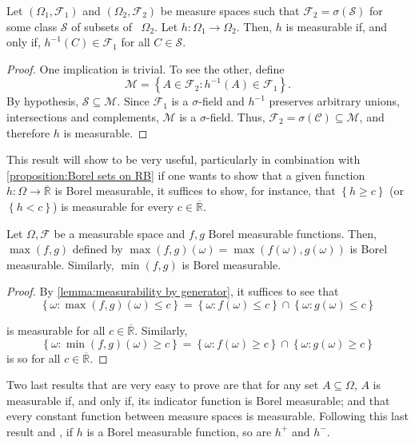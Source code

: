 \begin{lemm}\label{lemma:measurability by generator}
Let \(\left(\Omega_1,\mathcal{F}_1\right)\) and \(\left(\Omega_2,\mathcal{F}_2\right)\) be measure
spaces such that \(\mathcal{F}_2=\sigma(\mathcal{S})\) for some class \(\mathcal{S}\) of
subsets of ~\(\Omega_{2}\). Let \(h:\Omega_1\to\Omega_2\). Then, \(h\) is
measurable if, and only if, \(h^{-1}(C)\in\mathcal{F}_1\) for all \(C\in\mathcal{S}\).
\end{lemm}
\begin{proof} One implication is trivial. To see the other, define
	\[\mathcal{M}=\left\{A\in\mathcal{F}_2\colon h^{-1}(A)\in\mathcal{F}_1\right\}.\] By
hypothesis, \(\mathcal{S}\subseteq\mathcal{M}\). Since \(\mathcal{F}_1\) is a
\(\sigma\)-field and \(h^{-1}\) preserves arbitrary unions, intersections and
complements, \(\mathcal{M}\) is a \(\sigma\)-field. Thus,
\(\mathcal{F}_2=\sigma(\mathcal{C})\subseteq\mathcal{M}\), and therefore \(h\) is measurable.
\end{proof}
This result will show to be very useful, particularly in combination
with \cref{proposition:Borel sets on RB} if one wants to show that a
given function \(h\colon\Omega\to\overline{\mathbb{R}}\) is Borel measurable, it
suffices to show, for instance, that \(\left\{h\geq c\right\}\) (or \(\left\{h<c\right\}\)) is
measurable for every \(c\in\overline{\mathbb{R}}\).

\begin{lemm}\label{lemma:min and max are Borel measurable} Let \(\Omega,\mathcal{F}\) be
a measurable space and \(f,g\) Borel measurable functions. Then,
\(\max(f,g)\) defined by \(\max(f,g)(\omega)=\max(f(\omega),g(\omega))\)
is Borel measurable. Similarly, \(\min(f,g)\) is Borel measurable.
\end{lemm}
\begin{proof} By \cref{lemma:measurability by generator}, it suffices to see that
	\[\left\{\omega\colon \max(f,g)(\omega)\leq c\right\}=\left\{\omega\colon f(\omega)\leq c\right\}\cap\left\{\omega\colon g(\omega)\leq c\right\}\]
	
	is measurable for all \(c\in\overline{\mathbb{R}}\). Similarly,
\[
\left\{\omega\colon \min(f,g)(\omega)\geq c\right\}=\left\{\omega\colon f(\omega)\geq c\right\}\cap\left\{\omega\colon g(\omega)\geq c\right\}
\]
is so for all
\(c\in\overline{\mathbb{R}}\).
\end{proof}

Two last results that are very easy to prove are that for any set
\(A\subseteq\Omega\), \(A\) is measurable if, and only if, its indicator
function is Borel measurable; and that every constant function between measure
spaces is measurable. Following this last result and , if \(h\) is a Borel measurable function, so are \(h^+\) and
\(h^-\).

